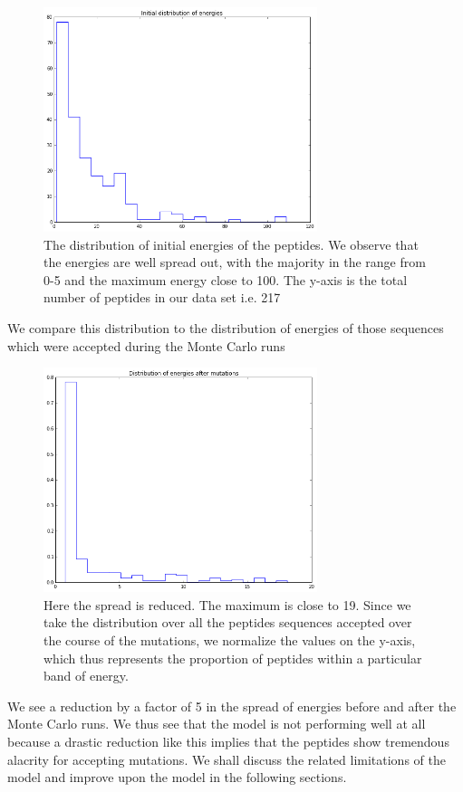 \documentclass[a4paper, 12pt]{article}
\begin{document}
 	\begin{figure}
 	\label{hist_ini_energies}
 	\centering
 	\includegraphics[width=8cm]{Images/hist_ini_energies.png}
 	\caption{The distribution of initial energies of the peptides. We observe that the energies are well spread out, with the majority in the range from 0-5 and the maximum energy close to 100. The y-axis is the total number of peptides in our data set i.e. 217}
 	\end{figure}

 	We compare this distribution to the distribution of energies of those sequences which were accepted during the Monte Carlo runs

 	\begin{figure}[!h]
 	\label{hist_final_energies} 
 	\centering
 	\includegraphics[width=8cm]{Images/hist_fin_energies.png}
 	\caption{Here the spread is reduced. The maximum is close to 19. Since we take the distribution over all the peptides sequences accepted over the course of the mutations, we normalize the values on the y-axis, which thus represents the proportion of peptides within a particular band of energy.}
 	\end{figure} 

 	We see a reduction by a factor of 5 in the spread of energies before and after the Monte Carlo runs. We thus see that the model is not performing well at all because a drastic reduction like this implies that the peptides show tremendous alacrity for accepting mutations. We shall discuss the related limitations of the model and improve upon the model in the following sections. 
\end{document}
